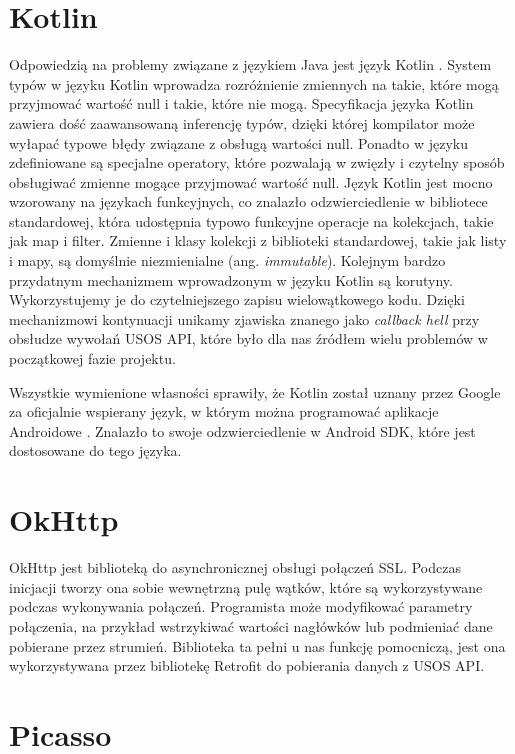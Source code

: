 \documentclass{pracamgr}
\begin{document}
\section{Kotlin}

Odpowiedzią na problemy związane z językiem Java jest język Kotlin \cite{kotlin}.
System typów w języku Kotlin wprowadza rozróżnienie zmiennych na takie, które mogą
przyjmować wartość null i takie, które nie mogą. Specyfikacja języka Kotlin zawiera
dość zaawansowaną inferencję typów, dzięki której kompilator może wyłapać typowe błędy
związane z obsługą wartości null. Ponadto w języku zdefiniowane są specjalne
operatory, które pozwalają w zwięzły i czytelny sposób obsługiwać zmienne mogące
przyjmować wartość null. Język Kotlin jest mocno wzorowany na językach funkcyjnych,
co znalazło odzwierciedlenie w bibliotece standardowej, która udostępnia typowo
funkcyjne operacje na kolekcjach, takie jak map i filter. Zmienne i klasy
kolekcji z biblioteki standardowej, takie jak listy i mapy, są domyślnie niezmienialne
(ang. \textit{immutable}). Kolejnym bardzo przydatnym mechanizmem wprowadzonym w
języku Kotlin są korutyny. Wykorzystujemy je do czytelniejszego zapisu wielowątkowego
kodu. Dzięki mechanizmowi kontynuacji unikamy zjawiska znanego jako \textit{callback hell}
przy obsłudze wywołań USOS API, które było dla nas źródłem wielu problemów w
początkowej fazie projektu.

Wszystkie wymienione własności sprawiły, że Kotlin został uznany przez
Google za oficjalnie wspierany język, w którym można programować aplikacje
Androidowe \cite{kotlinandroid}. Znalazło to swoje odzwierciedlenie w Android SDK,
które jest dostosowane do tego języka.

\section{OkHttp}

OkHttp \cite{okhttp} jest biblioteką do asynchronicznej obsługi połączeń SSL.
Podczas inicjacji tworzy ona sobie wewnętrzną pulę wątków, które są wykorzystywane
podczas wykonywania połączeń. Programista może modyfikować parametry połączenia,
na przykład wstrzykiwać wartości nagłówków lub podmieniać dane pobierane przez
strumień. Biblioteka ta pełni u nas funkcję pomocniczą, jest ona wykorzystywana
przez bibliotekę Retrofit do pobierania danych z USOS API.

\section{Picasso}
\end{document}
